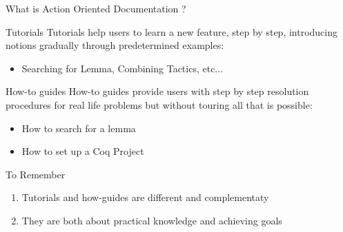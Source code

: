 \documentclass[10pt]{beamer}
\begin{document}
\begin{frame}{What is Action Oriented Documentation ?}
  \vspace*{-4pt}
  \begin{tcbProp}{Tutorials}
    Tutorials help users to learn a new feature, step by step, introducing
    notions gradually through predetermined examples:
    \begin{itemize}[label=$\hookrightarrow$]
      \item<2-> Searching for Lemma, Combining Tactics, etc...
    \end{itemize}
  \end{tcbProp}
  \vspace*{-4pt}
  \begin{tcbProp}{How-to guides}
    How-to guides provide users with step by step resolution procedures for real
    life problems but without touring all that is possible:
    \begin{itemize}[label=$\hookrightarrow$]
      \item<4-> How to search for a lemma
      \item<5-> How to set up a Coq Project
    \end{itemize}
  \end{tcbProp}
  \vspace*{-4pt}
  \begin{tcbSol}{To Remember}
    \begin{enumerate}
      \item Tutorials and how-guides are different and complementaty
      \item They are both about practical knowledge and achieving goals
    \end{enumerate}
  \end{tcbSol}
\end{frame}
\end{document}
